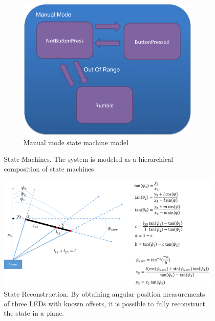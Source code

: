 \documentclass[conference, twocolumn]{IEEEtran}
\begin{document}
\begin{figure}
\begin{center}
    \vspace{0.05\linewidth}
    
    \begin{subfigure}[b]{0.7\linewidth}
    \begin{center}
    \includegraphics[width=1\linewidth]{../images/manual}
    \caption{Manual mode state machine model}
     \label{fig:manual_state}
    \end{center}
    \end{subfigure}
\end{center}

\caption{State Machines. The system is modeled as a hierarchical composition of state machines}
\label{fig:state_machines}
\end{figure}

\begin{figure}
\begin{center}
\includegraphics[width=\linewidth]{../images/geometry_and_equations_update}
\end{center}

\caption{State Reconstruction. By obtaining angular position measurements of three LEDs with known offsets, it is possible to fully reconstruct the state in a plane.}
\label{fig:geometry}
\end{figure}
\end{document}
